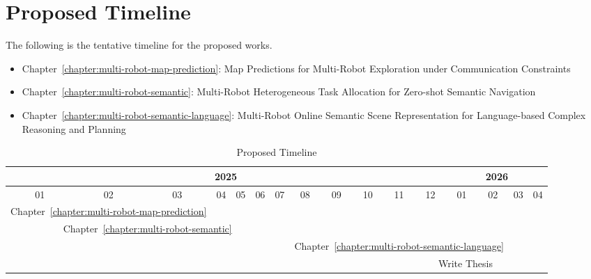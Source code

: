 \chapter{Proposed Timeline}
\label{chapter:proposed_timeline}

The following is the tentative timeline for the proposed works. 

\begin{itemize}
    \item Chapter~\ref{chapter:multi-robot-map-prediction}: Map Predictions for Multi-Robot Exploration under Communication Constraints
    \item Chapter~\ref{chapter:multi-robot-semantic}:  Multi-Robot Heterogeneous Task Allocation for Zero-shot Semantic Navigation 
    \item Chapter~\ref{chapter:multi-robot-semantic-language}: Multi-Robot Online Semantic Scene Representation for Language-based Complex Reasoning and Planning
\end{itemize}

\begin{table}[h]
\begin{center}
\begin{tabular}{|c|c|c|c|c|c|c|c|c|c|c|c|c|c|c|c|}
\hline
\multicolumn{12}{|c|}{2025} & \multicolumn{4}{|c|}{2026} \\ \hline
01 & 02 & 03 & 04 & 05 & 06 & 07 & 08 & 09 & 10 & 11 & 12 & 01 & 02 & 03 & 04 \\ \hline
\multicolumn{3}{|c|}{\cellcolor{yellow}Chapter~\ref{chapter:multi-robot-map-prediction}} & \multicolumn{13}{c|}{} \\ \hline
\multicolumn{7}{|c|}{\cellcolor{cyan}Chapter~\ref{chapter:multi-robot-semantic}} & \multicolumn{9}{c|}{} \\ \hline
\multicolumn{7}{|c|}{} & \multicolumn{7}{c|}{\cellcolor{green}Chapter~\ref{chapter:multi-robot-semantic-language}} & \multicolumn{2}{c|}{} \\ \hline
\multicolumn{10}{|c|}{} & \multicolumn{6}{c|}{\cellcolor{orange}Write Thesis} \\ \hline
\end{tabular}
\caption[Proposed Timeline]{Proposed Timeline}
\label{tab:proposed_timeline}
\end{center}
\end{table}
